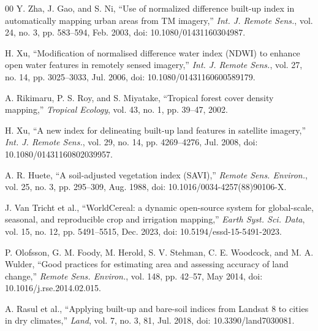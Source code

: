 \documentclass[conference]{IEEEtran}
\begin{document}
\begin{thebibliography}{00}
 Y. Zha, J. Gao, and S. Ni, ``Use of normalized
difference built-up index in automatically mapping urban areas from TM
imagery,'' \emph{Int. J. Remote Sens.}, vol. 24, no. 3, pp. 583--594,
Feb. 2003, doi: 10.1080/01431160304987.

 H. Xu, ``Modification of normalised difference water
index (NDWI) to enhance open water features in remotely sensed
imagery,'' \emph{Int. J. Remote Sens.}, vol. 27, no. 14, pp. 3025--3033,
Jul. 2006, doi: 10.1080/01431160600589179.

 A. Rikimaru, P. S. Roy, and S. Miyatake, ``Tropical
forest cover density mapping,'' \emph{Tropical Ecology}, vol. 43, no. 1,
pp. 39--47, 2002.

 H. Xu, ``A new index for delineating built-up land
features in satellite imagery,'' \emph{Int. J. Remote Sens.}, vol. 29,
no. 14, pp. 4269--4276, Jul. 2008, doi: 10.1080/01431160802039957.

 A. R. Huete, ``A soil-adjusted vegetation index
(SAVI),'' \emph{Remote Sens. Environ.}, vol. 25, no. 3, pp. 295--309,
Aug. 1988, doi: 10.1016/0034-4257(88)90106-X.

 J. Van Tricht et al., ``WorldCereal: a dynamic
open-source system for global-scale, seasonal, and reproducible crop and
irrigation mapping,'' \emph{Earth Syst. Sci. Data}, vol. 15, no. 12, pp.
5491--5515, Dec. 2023, doi: 10.5194/essd-15-5491-2023.

 P. Olofsson, G. M. Foody, M. Herold, S. V. Stehman,
C. E. Woodcock, and M. A. Wulder, ``Good practices for estimating area
and assessing accuracy of land change,'' \emph{Remote Sens. Environ.},
vol. 148, pp. 42--57, May 2014, doi: 10.1016/j.rse.2014.02.015.

 A. Rasul et al., ``Applying built-up and bare-soil
indices from Landsat 8 to cities in dry climates,'' \emph{Land}, vol. 7,
no. 3, 81, Jul. 2018, doi: 10.3390/land7030081.

\end{thebibliography}
\end{document}
